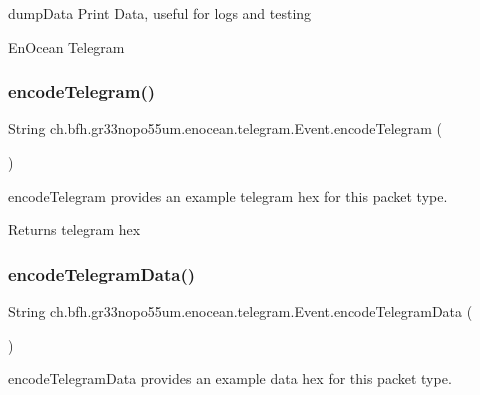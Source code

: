 dump\+Data Print Data, useful for logs and testing 

En\+Ocean Telegram \hypertarget{classch_1_1bfh_1_1gr33nopo55um_1_1enocean_1_1telegram_1_1_event_ab69f08367e723db4711c44242a8324ee}{}\label{classch_1_1bfh_1_1gr33nopo55um_1_1enocean_1_1telegram_1_1_event_ab69f08367e723db4711c44242a8324ee} 
\subsubsection{\texorpdfstring{encode\+Telegram()}{encodeTelegram()}}
{\footnotesize\ttfamily String ch.\+bfh.\+gr33nopo55um.\+enocean.\+telegram.\+Event.\+encode\+Telegram (\begin{DoxyParamCaption}{ }\end{DoxyParamCaption})}

encode\+Telegram provides an example telegram hex for this packet type.

\begin{DoxyReturn}{Returns}
telegram hex 
\end{DoxyReturn}
\hypertarget{classch_1_1bfh_1_1gr33nopo55um_1_1enocean_1_1telegram_1_1_event_a1a3451a87a9cac07d0e3640be8541fbe}{}\label{classch_1_1bfh_1_1gr33nopo55um_1_1enocean_1_1telegram_1_1_event_a1a3451a87a9cac07d0e3640be8541fbe} 
\subsubsection{\texorpdfstring{encode\+Telegram\+Data()}{encodeTelegramData()}}
{\footnotesize\ttfamily String ch.\+bfh.\+gr33nopo55um.\+enocean.\+telegram.\+Event.\+encode\+Telegram\+Data (\begin{DoxyParamCaption}{ }\end{DoxyParamCaption})}

encode\+Telegram\+Data provides an example data hex for this packet type.

